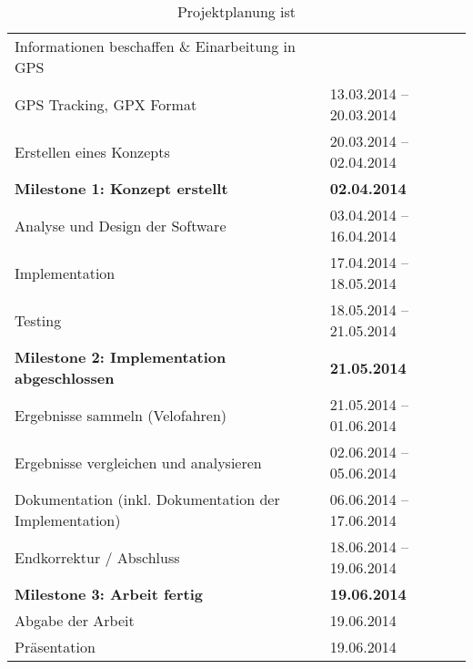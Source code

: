 \begin{table}[H]
\begin{center}
\begin{tabular}{|l|l|}
	\hline
	Informationen beschaffen \& Einarbeitung in GPS & \\
	GPS Tracking, GPX Format & 13.03.2014 – 20.03.2014\\ \hline
	Erstellen eines Konzepts  & 20.03.2014 – 02.04.2014\\ \hline
	\textbf{Milestone 1: Konzept erstellt} & \textbf{02.04.2014}\\ \hline
	Analyse und Design der Software & 03.04.2014 – 16.04.2014\\ \hline
	Implementation & 17.04.2014 – 18.05.2014\\ \hline
	Testing & 18.05.2014 – 21.05.2014\\ \hline
	\textbf{Milestone 2: Implementation abgeschlossen} & \textbf{21.05.2014} \\ \hline
	Ergebnisse sammeln (Velofahren) & 21.05.2014 – 01.06.2014\\ \hline
	Ergebnisse vergleichen und analysieren & 02.06.2014 – 05.06.2014\\ \hline
	Dokumentation (inkl. Dokumentation der Implementation) & 06.06.2014 – 17.06.2014\\ \hline
	Endkorrektur / Abschluss & 18.06.2014 – 19.06.2014\\ \hline
	\textbf{Milestone 3: Arbeit fertig} & \textbf{19.06.2014} \\ \hline
	Abgabe der Arbeit & 19.06.2014 \\ \hline
	Präsentation & 19.06.2014 \\ \hline
\end{tabular}
\caption{Projektplanung ist}
\end{center}
\end{table}
